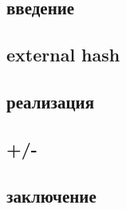 \documentclass[aspectratio=169]{beamer}
\begin{document}
      \subsection{введение}
        
      \subsection{external hash}
        
      \subsection{реализация}
        
      \subsection{+/-}
        
      \subsection{заключение}
        
\end{document}

